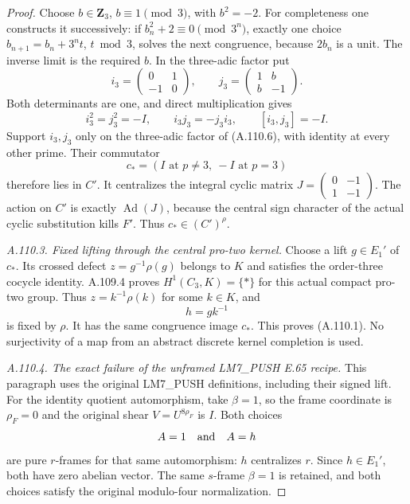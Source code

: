 \begin{proof}
Choose \(b\in\mathbf Z_3\), \(b\equiv1\pmod3\), with \(b^2=-2\).
For completeness one constructs it successively: if
\(b_n^2+2\equiv0\pmod{3^n}\), exactly one choice
\(b_{n+1}=b_n+3^nt\), \(t\bmod3\), solves the next congruence,
because \(2b_n\) is a unit. The inverse limit is the required \(b\).
In the three-adic factor put
\[
 i_3=\begin{pmatrix}0&1\\-1&0\end{pmatrix},\qquad
 j_3=\begin{pmatrix}1&b\\b&-1\end{pmatrix}.
 \tag{A.110.7}
\]
Both determinants are one, and direct multiplication gives
\[
 i_3^2=j_3^2=-I,\qquad i_3j_3=-j_3i_3,\qquad
 [i_3,j_3]=-I.
 \tag{A.110.8}
\]
Support \(i_3,j_3\) only on the three-adic factor of (A.110.6),
with identity at every other prime. Their commutator
\[
 c_*=(I\text{ at }p\ne3,\ -I\text{ at }p=3)
 \]
therefore lies in \(C'\). It centralizes the integral cyclic
matrix \(J=\left(\begin{smallmatrix}0&-1\\1&-1\end{smallmatrix}\right)\).
The action on \(C'\) is exactly \(\operatorname{Ad}(J)\), because
the central sign character of the actual cyclic substitution
kills \(F'\). Thus \(c_*\in(C')^\rho\).

\emph{A.110.3. Fixed lifting through the central pro-two kernel.}
Choose a lift \(g\in E_1'\) of \(c_*\). Its crossed defect
\(z=g^{-1}\rho(g)\) belongs to \(K\) and satisfies the order-three
cocycle identity. A.109.4 proves \(H^1(C_3,K)=\{*\}\) for this
actual compact pro-two group. Thus \(z=k^{-1}\rho(k)\) for some
\(k\in K\), and
\[
 h=gk^{-1}
 \]
is fixed by \(\rho\). It has the same congruence image \(c_*\).
This proves (A.110.1). No surjectivity of a map from an abstract
discrete kernel completion is used.

\emph{A.110.4. The exact failure of the unframed LM7\_PUSH E.65 recipe.}
This paragraph uses the original LM7\_PUSH definitions, including
their signed lift. For the identity quotient automorphism, take
\(\beta=1\), so the frame coordinate is \(\rho_F=0\) and the
original shear \(V=U^{8\rho_F}\) is \(I\). Both choices
\[
 A=1\quad\hbox{and}\quad A=h
 \]
are pure \(r\)-frames for that same automorphism: \(h\) centralizes
\(r\). Since \(h\in E_1'\), both have zero abelian vector. The
same \(s\)-frame \(\beta=1\) is retained, and both choices satisfy
the original modulo-four normalization.


\end{proof}
